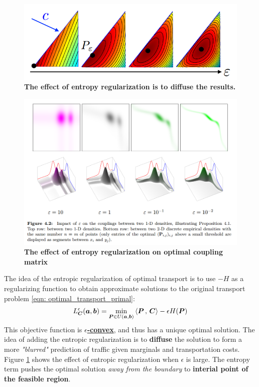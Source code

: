 \documentclass[11pt]{article}
\begin{document}
\begin{figure}
\begin{minipage}[t]{1\linewidth}
  \centering
  \centerline{\includegraphics[scale = 0.4]{entropy_regularization1.png}}
\end{minipage}
\caption{\footnotesize{\textbf{The effect of entropy regularization is to diffuse the results.}}}
\label{fig: entropy_regularization1}
\end{figure}
\begin{figure}
\begin{minipage}[t]{1\linewidth}
  \centering
  \centerline{\includegraphics[scale = 0.4]{entropy_regularization2.png}}
\end{minipage}
\caption{\footnotesize{\textbf{The effect of entropy regularization on optimal coupling matrix}}}
\label{fig: entropy_regularization2}
\end{figure}

The idea of the entropic regularization of optimal transport is to use $-H$ as a regularizing function to obtain approximate solutions to the original transport problem \eqref{eqn: optimal_transport_primal}:
\begin{align}
L_{\boldsymbol{C}}^{\epsilon}(\boldsymbol{a}, \boldsymbol{b}) = \min_{\boldsymbol{P} \in U(\boldsymbol{a}, \boldsymbol{b})} \left\langle \boldsymbol{P}\,,\, \boldsymbol{C} \right\rangle - \epsilon H(\boldsymbol{P}) \label{eqn: optimal_transport_primal_entropy_reg}
\end{align} This objective function is \underline{\textbf{$\epsilon$-convex}}, and thus has a unique optimal solution. The idea of adding the entropic regularization is to \textbf{diffuse} the solution to form a more \emph{"blurred"} prediction of traffic given marginals and transportation costs. Figure \ref{fig: entropy_regularization1} shows the effect of entropic regularization when $\epsilon$ is large. The entropy term pushes the optimal solution \emph{away from the boundary} to \textbf{interial point of the feasible region}.
\end{document}

